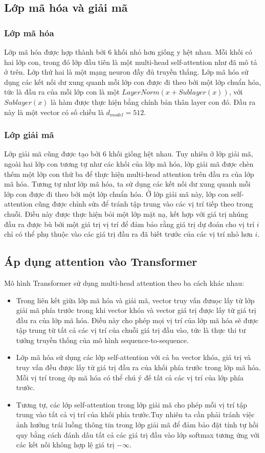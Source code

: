 \documentclass[14pt]{extreport}
\begin{document}
\subsection{Lớp mã hóa và giải mã}
\subsubsection{Lớp mã hóa}
Lớp mã hóa được hợp thành bởi $6$ khối nhỏ hơn giống y hệt nhau. Mỗi khối có hai lớp con, trong đó  lớp đầu tiên là một multi-head self-attention như đã mô tả ở trên. Lớp thứ hai là một mạng neuron đầy đủ truyền thẳng.  Lớp mã hóa sử dụng các kết nối dư xung quanh mỗi lớp con được đi theo bởi một lớp chuẩn hóa, tức là đầu ra của mỗi lớp con là một $LayerNorm(x+Sublayer(x))$, với $Sublayer(x)$ là hàm được thực hiện bằng chính bản thân layer con đó. Đầu ra này là một vector có số chiều là $d_{model}=512$.
\subsubsection{Lớp giải mã}
Lớp giải mã cũng được tạo bởi $6$ khối giống hệt nhau. Tuy nhiên ở lớp giải mã, ngoài hai lớp con tương tự như các khối của lớp mã hóa, lớp giải mã được chèn thêm một lớp con thứ ba để thực hiện multi-head attention trên đầu ra của lớp mã hóa. Tương tự như lớp mã hóa, ta sử dụng các kết nối dư xung quanh mỗi lớp con được đi theo bởi một lớp chuẩn hóa. Ở lớp giải mã này, lớp con self-attention cũng được chỉnh sửa để tránh tập trung vào các vị trí tiếp theo trong chuỗi. Điều này được thực hiện bỏi một lớp mặt nạ, kết hợp với giá trị nhúng đầu ra được bù bởi một giá trị vị trí để đảm bảo rằng giá trị dự đoán cho vị trí $i$ chỉ có thể phụ thuộc vào các giá trị đầu ra đã biết trước của các vị trí nhỏ hơn $i$.

\subsection{Áp dụng attention vào Transformer}
Mô hình Transformer sử dụng multi-head attention theo ba cách khác nhau:
\begin{itemize}
    \item Trong liên kết giữa lớp mã hóa và giải mã, vector truy vấn đưuọc lấy từ lớp giải mã phía trước trong khi vector khóa và vector giá trị được lấy từ giá trị đầu ra của lớp mã hóa. Điều này cho phép mọi vị trí của lớp mã hóa sẽ được tập trung từ tất cả các vị trí của chuỗi giá trị đầu vào, tức là thực thi tư tưởng truyền thống của mô hình sequence-to-sequence.
    \item Lớp mã hóa sử dụng các lớp self-attention với cả ba vector khóa, giá trị và truy vấn đều được lấy từ giá trị đầu ra của khối phía trước trong lớp mã hóa. Mỗi vị trí trong ớp mã hóa có thể chú ý đế tất cả các vị trí của lớp phía trước.
    \item Tương tự, các lớp self-attention trong lớp giải mã cho phép mỗi vị trí tập trung vào tất cả vị trí của khối phía trước.Tuy nhiên ta cần phải tránh việc ảnh hưởng trái luồng thông tin trong lớp giải mã để đảm bảo đặt tính tự hồi quy bằng cách đánh dấu tất cả các giá trị đầu vào lớp softmax tương ứng với các kết nối không hợp lệ giá trị $-\infty$.
\end{itemize}
\end{document}
